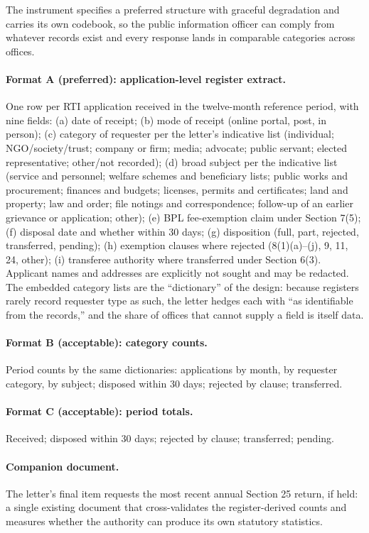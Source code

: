 \documentclass[11pt]{article}
\begin{document}
The instrument specifies a preferred structure with graceful degradation and carries its own codebook, so the public information officer can comply from whatever records exist and every response lands in comparable categories across offices.

\paragraph{Format A (preferred): application-level register extract.} One row per RTI application received in the twelve-month reference period, with nine fields: (a) date of receipt; (b) mode of receipt (online portal, post, in person); (c) category of requester per the letter's indicative list (individual; NGO/society/trust; company or firm; media; advocate; public servant; elected representative; other/not recorded); (d) broad subject per the indicative list (service and personnel; welfare schemes and beneficiary lists; public works and procurement; finances and budgets; licenses, permits and certificates; land and property; law and order; file notings and correspondence; follow-up of an earlier grievance or application; other); (e) BPL fee-exemption claim under Section 7(5); (f) disposal date and whether within 30 days; (g) disposition (full, part, rejected, transferred, pending); (h) exemption clauses where rejected (8(1)(a)--(j), 9, 11, 24, other); (i) transferee authority where transferred under Section 6(3). Applicant names and addresses are explicitly not sought and may be redacted. The embedded category lists are the ``dictionary'' of the design: because registers rarely record requester type as such, the letter hedges each with ``as identifiable from the records,'' and the share of offices that cannot supply a field is itself data.

\paragraph{Format B (acceptable): category counts.} Period counts by the same dictionaries: applications by month, by requester category, by subject; disposed within 30 days; rejected by clause; transferred.

\paragraph{Format C (acceptable): period totals.} Received; disposed within 30 days; rejected by clause; transferred; pending.

\paragraph{Companion document.} The letter's final item requests the most recent annual Section 25 return, if held: a single existing document that cross-validates the register-derived counts and measures whether the authority can produce its own statutory statistics.
\end{document}
